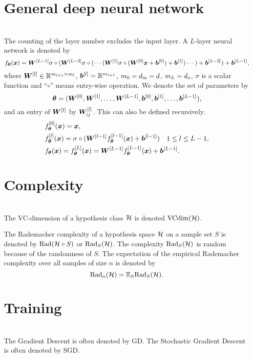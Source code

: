 \documentclass{article}
\begin{document}
\section{General deep neural network}~\\
The counting of the layer number excludes the input layer. A $L$-layer neural network is denoted by
\begin{equation}
    f_{\bm{\theta}}(\bm{x}) = \bm{W}^{[L-1]} \sigma\circ(\bm{W}^{[L-2]}\sigma\circ(\cdots (\bm{W}^{[1]} \sigma\circ(\bm{W}^{[0]} \bm{x} + \bm{b}^{[0]} ) + \bm{b}^{[1]} )\cdots)+\bm{b}^{[L-2]})+\bm{b}^{[L-1]},
\end{equation}
where $\bm{W}^{[l]} \in \mathbb{R}^{m_{l+1}\times m_{l}}$, $\bm{b}^{[l]}=\mathbb{R}^{m_{l+1}}$, $m_0=d_{\rm in}=d$, $m_{L}=d_{\rm o}$,
$\sigma$ is a scalar function and ``$\circ$'' means entry-wise operation. 
We denote the set of parameters by \[
\bm{\theta}=(\bm{W}^{[0]},\bm{W}^{[1]},\ldots,\bm{W}^{[L-1]},\bm{b}^{[0]},\bm{b}^{[1]},\ldots,\bm{b}^{[L-1]}),
\] 
and  an entry of $\bm{W}^{[l]}$ by   $\bm{W}^{[l]}_{ij}$. This can also be defined recursively.
\begin{align}
    &f_{\bm{\theta}}^{[0]}(\bm{x})=\bm{x}, \\
    &f_{\bm{\theta}}^{[l]}(\bm{x})=\sigma\circ(\bm{W}^{[l-1]} f_{\bm{\theta}}^{[l-1]}(\bm{x}) + \bm{b}^{[l-1]}) \quad 1\leq l\leq L-1,\\
    &f_{\bm{\theta}}(\bm{x})=f_{\bm{\theta}}^{[L]}(\bm{x})=\bm{W}^{[L-1]} f_{\bm{\theta}}^{[L-1]}(\bm{x}) + \bm{b}^{[L-1]}.
\end{align}

\section{Complexity}~\\
The VC-dimension of a hypothesis class $\mathcal{H}$ is denoted ${\rm VCdim}(\mathcal{H})$.

The Rademacher complexity of a hypothesis space $\mathcal{H}$ on a sample set $S$ is denoted by ${\rm Rad} (\mathcal{H}\circ S)$ or ${\rm Rad}_{S} (\mathcal{H})$. The complexity ${\rm Rad}_{S} (\mathcal{H})$ is random because of the randomness of $S$. The expectation of the empirical Rademacher complexity over all samples of size $n$ is denoted by 
\[
{\rm Rad}_{n} (\mathcal{H})=\mathbb{E}_{S} {\rm Rad}_{S} (\mathcal{H}).
\]

\section{Training}~\\
The Gradient Descent is often denoted by GD. The Stochastic Gradient Descent is often denoted by SGD. 
\end{document}
